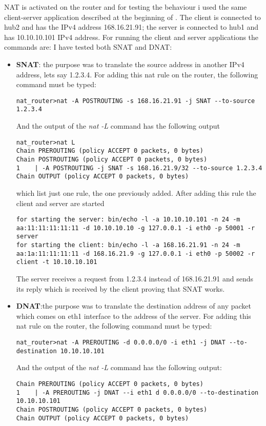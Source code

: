 {{NAT is activated on the router and for testing the behaviour i used the same client-server application described at the beginning of . The client is connected to hub2 and has the IPv4 address 168.16.21.91; the server is connected to hub1 and has 10.10.10.101 IPv4 address.
For running the client and server applications the commands are:
I have tested both SNAT and DNAT:
\begin{itemize}
\item \textbf{SNAT}: the purpose was to translate the source address in another IPv4 address, lets say 1.2.3.4.
For adding this nat rule on the router, the following command must be typed:
\lstset{language=TeX, caption=Add roule SNAT}
\begin{lstlisting}
nat_router>nat -A POSTROUTING -s 168.16.21.91 -j SNAT --to-source 1.2.3.4
\end{lstlisting}
And the output of the \textit{nat -L} command has the following output
\lstset{language=TeX, caption=List all rules for standard NAT chains}
\begin{lstlisting}
nat_router>nat L
Chain PREROUTING (policy ACCEPT 0 packets, 0 bytes)
Chain POSTROUTING (policy ACCEPT 0 packets, 0 bytes)
1	 | -A POSTROUTING -j SNAT -s 168.16.21.9/32 --to-source 1.2.3.4
Chain OUTPUT (policy ACCEPT 0 packets, 0 bytes)
\end{lstlisting}

which list just one rule, the one previously added. 
After adding this rule the client and server are started
\lstset{language=TeX, caption=SNAT-starting client and server applications}
\begin{lstlisting}
for starting the server: bin/echo -l -a 10.10.10.101 -n 24 -m aa:11:11:11:11:11 -d 10.10.10.10 -g 127.0.0.1 -i eth0 -p 50001 -r server 
for starting the client: bin/echo -l -a 168.16.21.91 -n 24 -m aa:1a:11:11:11:11 -d 168.16.21.9 -g 127.0.0.1 -i eth0 -p 50002 -r client -t 10.10.10.101
\end{lstlisting}
 The server receives a request from 1.2.3.4 instead of 168.16.21.91 and sends its reply which is received by the client proving that SNAT works.
\item \label{nat-impl:DNAT} \textbf{DNAT}:the purpose was to translate the destination address of any packet which comes on eth1 interface to the address of the server.
For adding this nat rule on the router, the following command must be typed:
\lstset{language=TeX, caption=Add roule SNAT}
\begin{lstlisting}
nat_router>nat -A PREROUTING -d 0.0.0.0/0 -i eth1 -j DNAT --to-destination 10.10.10.101
\end{lstlisting}
And the output of the \textit{nat -L} command has the following output:
\lstset{language=TeX, caption=List all rules for standard NAT chains}
\begin{lstlisting}
Chain PREROUTING (policy ACCEPT 0 packets, 0 bytes)
1	 | -A PREROUTING -j DNAT --i eth1 d 0.0.0.0/0 --to-destination 10.10.10.101
Chain POSTROUTING (policy ACCEPT 0 packets, 0 bytes)
Chain OUTPUT (policy ACCEPT 0 packets, 0 bytes)
\end{lstlisting}


\end{itemize}}}
